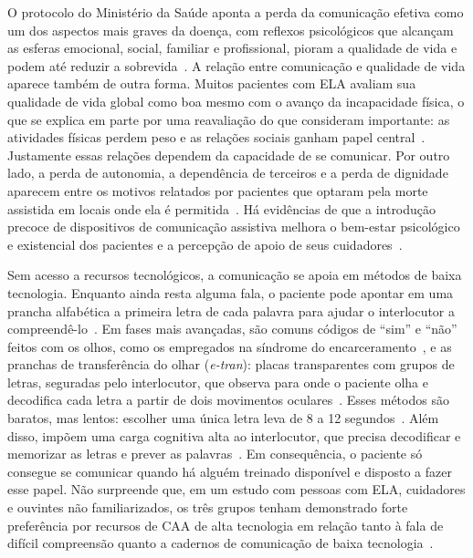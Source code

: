 O protocolo do Ministério da Saúde aponta a perda da comunicação efetiva como um dos aspectos mais graves da doença, com reflexos psicológicos que alcançam as esferas emocional, social, familiar e profissional, pioram a qualidade de vida e podem até reduzir a sobrevida~\cite{pcdt_ela2020}. A relação entre comunicação e qualidade de vida aparece também de outra forma. Muitos pacientes com \gls{ELA} avaliam sua qualidade de vida global como boa mesmo com o avanço da incapacidade física, o que se explica em parte por uma reavaliação do que consideram importante: as atividades físicas perdem peso e as relações sociais ganham papel central~\cite{hardiman2017als}. Justamente essas relações dependem da capacidade de se comunicar. Por outro lado, a perda de autonomia, a dependência de terceiros e a perda de dignidade aparecem entre os motivos relatados por pacientes que optaram pela morte assistida em locais onde ela é permitida~\cite{hardiman2017als}. Há evidências de que a introdução precoce de dispositivos de comunicação assistiva melhora o bem-estar psicológico e existencial dos pacientes e a percepção de apoio de seus cuidadores~\cite{londral2015quality}.

Sem acesso a recursos tecnológicos, a comunicação se apoia em métodos de baixa tecnologia. Enquanto ainda resta alguma fala, o paciente pode apontar em uma prancha alfabética a primeira letra de cada palavra para ajudar o interlocutor a compreendê-lo~\cite{beukelman2011communication}. Em fases mais avançadas, são comuns códigos de ``sim'' e ``não'' feitos com os olhos, como os empregados na síndrome do encarceramento~\cite{laureys2005locked}, e as pranchas de transferência do olhar (\textit{e-tran}): placas transparentes com grupos de letras, seguradas pelo interlocutor, que observa para onde o paciente olha e decodifica cada letra a partir de dois movimentos oculares~\cite{zhang2017gazespeak}. Esses métodos são baratos, mas lentos: escolher uma única letra leva de 8 a 12 segundos~\cite{zhang2017gazespeak}. Além disso, impõem uma carga cognitiva alta ao interlocutor, que precisa decodificar e memorizar as letras e prever as palavras~\cite{zhang2017gazespeak}. Em consequência, o paciente só consegue se comunicar quando há alguém treinado disponível e disposto a fazer esse papel. Não surpreende que, em um estudo com pessoas com \gls{ELA}, cuidadores e ouvintes não familiarizados, os três grupos tenham demonstrado forte preferência por recursos de \gls{CAA} de alta tecnologia em relação tanto à fala de difícil compreensão quanto a cadernos de comunicação de baixa tecnologia~\cite{beukelman2011communication}.

